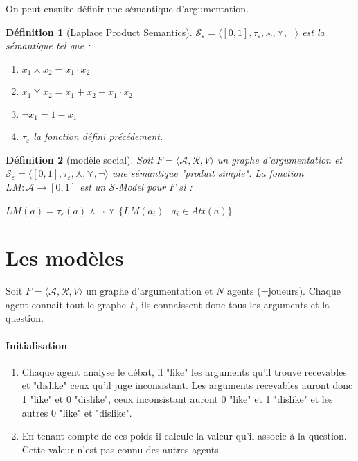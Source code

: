 \documentclass[12pt]{article}
\theoremstyle{defi}
\newtheorem{definition}{Définition}[section]
\theoremstyle{not}
\theoremstyle{prob}
\begin{document}
    On peut ensuite définir une sémantique d'argumentation.
    \begin{definition}[Laplace Product Semantics]
      $\mathcal{S}_\varepsilon = \langle [0, 1], \tau_\varepsilon, \curlywedge, \curlyvee, \neg  \rangle$ est la sémantique tel que :
      \begin{enumerate}
        \item $x_1 \curlywedge x_2 = x_1 \cdot x_2$
        \item $x_1 \curlyvee x_2 = x_1 + x_2 - x_1 \cdot x_2$
        \item $\neg x_1 = 1 - x_1$
        \item $\tau_\varepsilon$ la fonction défini précédement.
      \end{enumerate}

    \end{definition}

\begin{definition}[modèle social]
  Soit $F= \langle \mathcal{A}, \mathcal{R}, V \rangle$ un graphe d'argumentation et $\mathcal{S}_\varepsilon = \langle [0, 1], \tau_\varepsilon, \curlywedge, \curlyvee, \neg  \rangle$ une sémantique "produit simple".
  La fonction $LM : \mathcal{A} \rightarrow [0, 1]$ est un $\mathcal{S}$-Model pour $F$ si :

  $LM(a) = \tau_\varepsilon(a) \curlywedge \neg$ {\Large $\curlyvee$} $\{LM(a_i)\ |\ a_i \in Att(a)\}$
\end{definition}

\section{Les modèles}
  Soit $F = \langle \mathcal{A}, \mathcal{R}, V \rangle$ un graphe d'argumentation et $N$ agents (=joueurs). Chaque agent connait tout le graphe $F$, ils connaissent donc tous les arguments et la question.

  \paragraph{Initialisation}
  \begin{enumerate}
    \item Chaque agent analyse le débat, il "like" les arguments qu'il trouve recevables et "dislike" ceux qu'il juge inconsistant.
    Les arguments recevables auront donc 1 "like" et 0 "dislike", ceux inconsistant auront 0 "like" et 1 "dislike" et les autres 0 "like" et "dislike".
    \item En tenant compte de ces poids il calcule la valeur qu'il associe à la question. Cette valeur n'est pas connu des autres agents.
  \end{enumerate}
\end{document}
